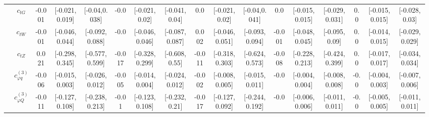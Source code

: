 \documentclass{article}
\begin{document}
\begin{table}[H]
\begin{tabular}{|c|c|c|c|c|c|c|c|c|c|c|c|c|c|c|c|c|}
 & $c_{tG}$ & -0.001                             & [-0.021,0.019]                                 & [-0.04,0.038] & -0.0                             & [-0.021,0.02]                                 & [-0.041,0.04] & 0.0                             & [-0.021,0.02]                                 & [-0.04,0.041] & 0.0                             & [-0.015,0.015]                                 & [-0.029,0.031] & 0.0                             & [-0.015,0.015]                                 & [-0.028,0.03] \\ \cline{2-17}
 & $c_{tW}$ & -0.001                             & [-0.046,0.044]                                 & [-0.092,0.088] & -0.0                             & [-0.046,0.046]                                 & [-0.087,0.087] & 0.002                             & [-0.046,0.051]                                 & [-0.093,0.094] & -0.001                             & [-0.048,0.045]                                 & [-0.095,0.09] & 0.0                             & [-0.014,0.015]                                 & [-0.029,0.029] \\ \cline{2-17}
 & $c_{tZ}$ & 0.021                             & [-0.298,0.345]                                 & [-0.577,0.599] & -0.017                             & [-0.328,0.299]                                 & [-0.608,0.55] & -0.011                             & [-0.318,0.303]                                 & [-0.624,0.573] & -0.008                             & [-0.228,0.213]                                 & [-0.424,0.399] & 0.0                             & [-0.017,0.017]                                 & [-0.034,0.034] \\ \cline{2-17}
 & $c_{\varphi q}^{(3)}$ & -0.006                             & [-0.015,0.003]                                 & [-0.026,0.012] & -0.005                             & [-0.014,0.004]                                 & [-0.024,0.012] & -0.002                             & [-0.008,0.005]                                 & [-0.015,0.011] & -0.0                             & [-0.004,0.004]                                 & [-0.008,0.008] & -0.0                             & [-0.004,0.003]                                 & [-0.007,0.006] \\ \cline{2-17}
 & $c_{\varphi Q}^{(3)}$ & -0.011                             & [-0.127,0.108]                                 & [-0.238,0.213] & -0.01                             & [-0.123,0.108]                                 & [-0.232,0.21] & -0.017                             & [-0.127,0.092]                                 & [-0.244,0.192] & -0.0                             & [-0.006,0.006]                                 & [-0.011,0.011] & -0.0                             & [-0.005,0.005]                                 & [-0.011,0.011] \\ \cline{2-17}

\end{tabular}
\end{table}
\end{document}
